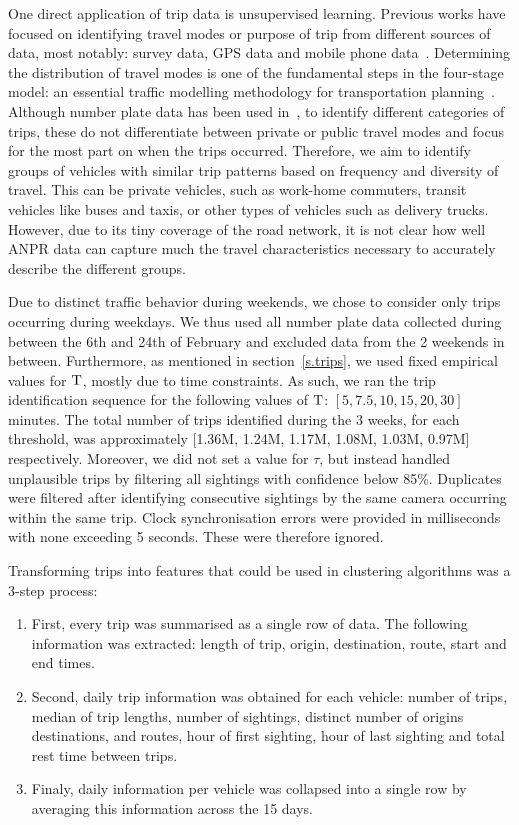 One direct application of trip data is unsupervised learning. Previous works have focused on identifying travel modes or purpose of trip from different sources of data, most notably: survey data, GPS data and mobile phone data~\cite{ODMobileData, ClusteringGPS}. Determining the distribution of travel modes is one of the fundamental steps in the four-stage model: an essential traffic modelling methodology for transportation planning~\cite{FourStepModel}. Although number plate data has been used in~\cite{Clustering}, to identify different categories of trips, these do not differentiate between private or public travel modes and focus for the most part on when the trips occurred. Therefore, we aim to identify groups of vehicles with similar trip patterns based on frequency and diversity of travel. This can be private vehicles, such as work-home commuters, transit vehicles like buses and taxis, or other types of vehicles such as delivery trucks.
However, due to its tiny coverage of the road network, it is not clear how well ANPR data can capture much the travel characteristics necessary to accurately describe the different groups.

Due to distinct traffic behavior during weekends, we chose to consider only trips occurring during weekdays. We thus used all number plate data collected during between the 6th and 24th of February and excluded data from the 2 weekends in between. Furthermore, as mentioned in section~\ref{s.trips}, we used fixed empirical values for $\mathrm{T}$, mostly due to time constraints. As such, we ran the trip identification sequence for the following values of $\mathrm{T}$: $[5 , 7.5, 10, 15, 20, 30]$ minutes. The total number of trips identified during the 3 weeks, for each threshold, was approximately [1.36M, 1.24M, 1.17M, 1.08M, 1.03M, 0.97M] respectively. Moreover, we did not set a value for $\tau$, but instead handled unplausible trips by filtering all sightings with confidence below 85\%. Duplicates were filtered after identifying consecutive sightings by the same camera occurring within the same trip. Clock synchronisation errors were provided in milliseconds with none exceeding 5 seconds. These were therefore ignored.

Transforming trips into features that could be used in clustering algorithms was a 3-step process:
\begin{enumerate}
  \item First, every trip was summarised as a single row of data. The following information was extracted: length of trip, origin, destination, route, start and end times.
  \item Second, daily trip information was obtained for each vehicle: number of trips, median of trip lengths, number of sightings, distinct number of origins destinations, and routes, hour of first sighting, hour of last sighting and total rest time between trips.
  \item Finaly, daily information per vehicle was collapsed into a single row by averaging this information across the 15 days.
\end{enumerate}

